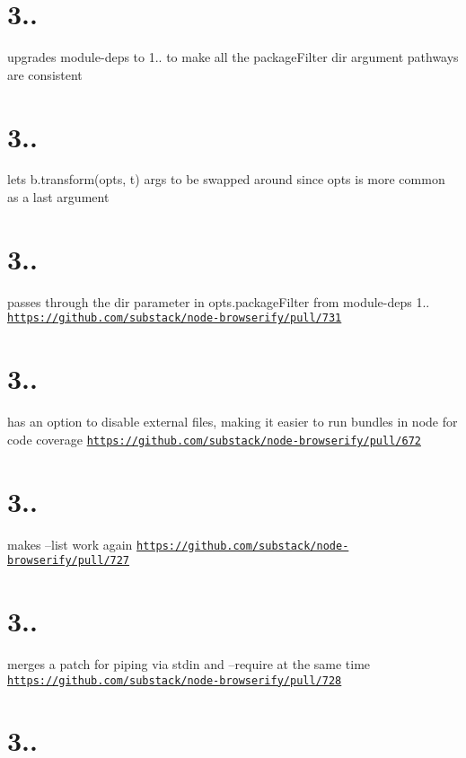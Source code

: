 \section*{3..}

upgrades module-\/deps to 1.. to make all the package\+Filter dir argument pathways are consistent

\section*{3..}

lets b.\+transform(opts, t) args to be swapped around since opts is more common as a last argument

\section*{3..}

passes through the dir parameter in opts.\+package\+Filter from module-\/deps 1.. \href{https://github.com/substack/node-browserify/pull/731}{\tt https\+://github.\+com/substack/node-\/browserify/pull/731}

\section*{3..}

has an option to disable external files, making it easier to run bundles in node for code coverage \href{https://github.com/substack/node-browserify/pull/672}{\tt https\+://github.\+com/substack/node-\/browserify/pull/672}

\section*{3..}

makes --list work again \href{https://github.com/substack/node-browserify/pull/727}{\tt https\+://github.\+com/substack/node-\/browserify/pull/727}

\section*{3..}

merges a patch for piping via stdin and --require at the same time \href{https://github.com/substack/node-browserify/pull/728}{\tt https\+://github.\+com/substack/node-\/browserify/pull/728}

\section*{3..}

